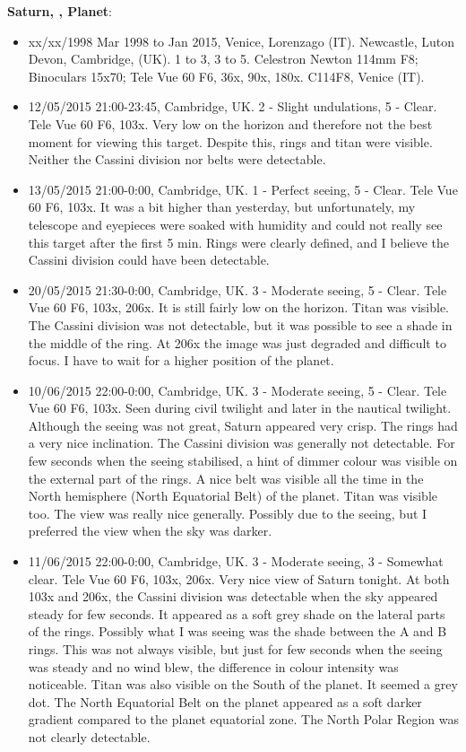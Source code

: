 {\bf Saturn, , Planet}:
\begin{itemize}
\item xx/xx/1998 Mar 1998 to Jan 2015, Venice, Lorenzago (IT). Newcastle, Luton Devon, Cambridge, (UK). 1 to 3, 3 to 5. Celestron Newton 114mm F8; Binoculars 15x70; Tele Vue 60 F6, 36x, 90x, 180x. C114F8, Venice (IT).
\item 12/05/2015 21:00-23:45, Cambridge, UK. 2 - Slight undulations, 5 - Clear. Tele Vue 60 F6, 103x. Very low on the horizon and therefore not the best moment for viewing this target. Despite this, rings and titan were visible. Neither the Cassini division nor belts were detectable.
\item 13/05/2015 21:00-0:00, Cambridge, UK. 1 - Perfect seeing, 5 - Clear. Tele Vue 60 F6, 103x. It was a bit higher than yesterday, but unfortunately, my telescope and eyepieces were soaked with humidity and could not really see this target after the first 5 min. Rings were clearly defined, and I believe the Cassini division could have been detectable.
\item 20/05/2015 21:30-0:00, Cambridge, UK. 3 - Moderate seeing, 5 - Clear. Tele Vue 60 F6, 103x, 206x. It is still fairly low on the horizon. Titan was visible. The Cassini division was not detectable, but it was possible to see a shade in the middle of the ring. At 206x the image was just degraded and difficult to focus. I have to wait for a higher position of the planet.
\item 10/06/2015 22:00-0:00, Cambridge, UK. 3 - Moderate seeing, 5 - Clear. Tele Vue 60 F6, 103x. Seen during civil twilight and later in the nautical twilight. Although the seeing was not great, Saturn appeared very crisp. The rings had a very nice inclination. The Cassini division was generally not detectable. For few seconds when the seeing stabilised, a hint of dimmer colour was visible on the external part of the rings. A nice belt was visible all the time in the North hemisphere (North Equatorial Belt) of the planet. Titan was visible too. The view was really nice generally. Possibly due to the seeing, but I preferred the view when the sky was darker. 
\item 11/06/2015 22:00-0:00, Cambridge, UK. 3 - Moderate seeing, 3 - Somewhat clear. Tele Vue 60 F6, 103x, 206x. Very nice view of Saturn tonight. At both 103x and 206x, the Cassini division was detectable when the sky appeared steady for few seconds. It appeared as a soft grey shade on the lateral parts of the rings. Possibly what I was seeing was the shade between the A and B rings. This was not always visible, but just for few seconds when the seeing was steady and no wind blew, the difference in colour intensity was noticeable. Titan was also visible on the South of the planet. It seemed a grey dot. The North Equatorial Belt on the planet appeared as a soft darker gradient compared to the planet equatorial zone. The North Polar Region was not clearly detectable.

\end{itemize}
